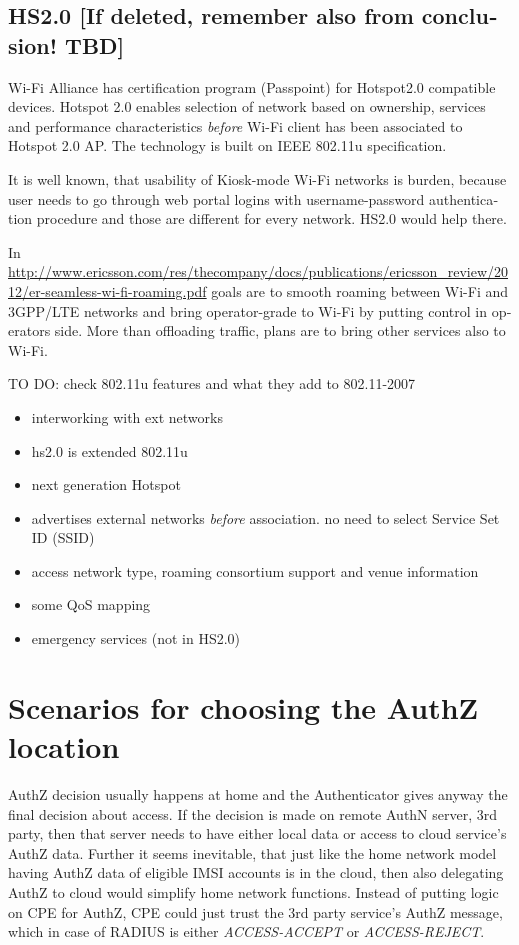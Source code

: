 \documentclass[12pt,a4paper,english]{tutthesis}
\begin{document}
\begin{otherlanguage}{english}
\subsection{HS2.0 [If deleted, remember also from conclusion! TBD]}
\label{sec-4-5-1}

Wi-Fi Alliance has certification program (Passpoint) for Hotspot2.0 compatible
devices.  Hotspot 2.0 enables selection of network based on ownership,
services and performance characteristics \emph{before} Wi-Fi client has
been associated to Hotspot 2.0 AP. The technology is built on
IEEE 802.11u specification.




It is well known, that usability of Kiosk-mode Wi-Fi
 networks is burden, because user needs to go through 
web portal logins with username-password authentication 
procedure and those are different for every network.
HS2.0 would help there.

In 
\url{http://www.ericsson.com/res/thecompany/docs/publications/ericsson_review/2012/er-seamless-wi-fi-roaming.pdf}
goals are to smooth roaming between Wi-Fi and 3GPP/LTE networks
and bring operator-grade to Wi-Fi by putting control in operators side. More
than offloading traffic, plans are to bring other services also to Wi-Fi.

TO DO: check 802.11u features and what they add to 802.11-2007
\begin{itemize}
\item interworking with ext networks
\item hs2.0 is extended 802.11u
\item next generation Hotspot
\item advertises external networks \emph{before} association. no need to
select Service Set ID (SSID)
\item access network type, roaming consortium support and venue information
\item some QoS mapping
\item emergency services (not in HS2.0)
\end{itemize}


\section{Scenarios for choosing the AuthZ location}
\label{sec-4-6}


AuthZ decision usually happens at home and the Authenticator gives
anyway the final decision about access.
If the decision is made on remote AuthN server, 3rd party, 
then that server needs to have either local data or access to 
cloud service's AuthZ data.
Further it seems inevitable, that just like the home network model
having AuthZ data of eligible IMSI accounts is in the cloud, 
then also delegating AuthZ to cloud would simplify home network 
functions. Instead of putting logic on CPE for AuthZ, CPE
could just trust the 3rd party service's AuthZ message, which in case
of RADIUS is either \emph{ACCESS-ACCEPT} or \emph{ACCESS-REJECT}.



\end{otherlanguage}
\end{document}
